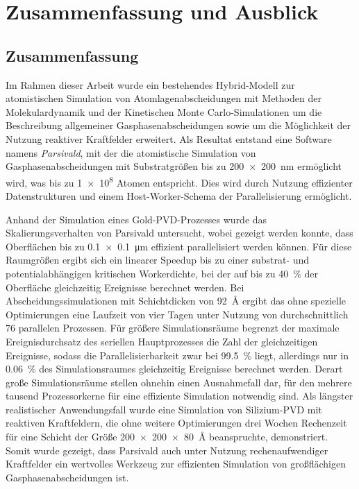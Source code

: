 \chapter{Zusammenfassung und Ausblick}
\label{summary}

\section{Zusammenfassung}

Im Rahmen dieser Arbeit wurde ein bestehendes Hybrid-Modell zur atomistischen Simulation von Atomlagenabscheidungen mit Methoden der Molekulardynamik und der Kinetischen Monte Carlo-Simulationen um die Beschreibung allgemeiner Gasphasenabscheidungen sowie um die Möglichkeit der Nutzung reaktiver Kraftfelder erweitert.
Als Resultat entstand eine Software namens \textit{Parsivald}, mit der die atomistische Simulation von Gasphasenabscheidungen mit Substratgrößen bis zu \SI{200x200}{\nano\meter} ermöglicht wird, was bis zu \num{1e8} Atomen entspricht.
Dies wird durch Nutzung effizienter Datenstrukturen und einem Host-Worker-Schema der Parallelisierung ermöglicht.


Anhand der Simulation eines Gold-PVD-Prozesses wurde das Skalierungsverhalten von Parsivald untersucht, wobei gezeigt werden konnte, dass Oberflächen bis zu \SI{0.1x0.1}{\micro\meter} effizient parallelisiert werden können.
Für diese Raumgrößen ergibt sich ein linearer Speedup bis zu einer substrat- und potentialabhängigen kritischen Workerdichte, bei der auf bis zu \SI{40}{\percent} der Oberfläche gleichzeitig Ereignisse berechnet werden.
Bei Abscheidungssimulationen mit Schichtdicken von \SI{92}{\angstrom} ergibt das ohne spezielle Optimierungen eine Laufzeit von vier Tagen unter Nutzung von durchschnittlich \num{76} parallelen Prozessen.
Für größere Simulationsräume begrenzt der maximale Ereignisdurchsatz des seriellen Hauptprozesses die Zahl der gleichzeitigen Ereignisse, sodass die Parallelisierbarkeit zwar bei \SI{99.5}{\percent} liegt, allerdings nur in \SI{0.06}{\percent} des Simulationsraumes gleichzeitig Ereignisse berechnet werden.
Derart große Simulationsräume stellen ohnehin einen Ausnahmefall dar, für den mehrere tausend Prozessorkerne für eine effiziente Simulation notwendig sind.
Als längster realistischer Anwendungsfall wurde eine Simulation von Silizium-PVD mit reaktiven Kraftfeldern, die ohne weitere Optimierungen drei Wochen Rechenzeit für eine Schicht der Größe \SI{200x200x80}{\angstrom} beanspruchte, demonstriert.
Somit wurde gezeigt, dass Parsivald auch unter Nutzung rechenaufwendiger Kraftfelder ein wertvolles Werkzeug zur effizienten Simulation von großflächigen Gasphasenabscheidungen ist.

